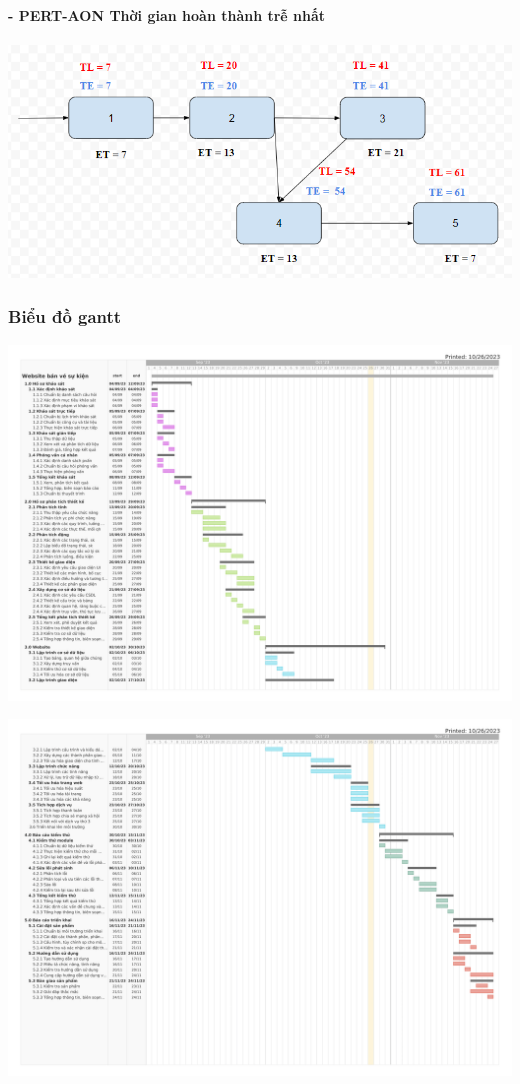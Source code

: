 \documentclass[12pt]{article}
\begin{document}
\hspace{1cm}\textbf{- PERT-AON Thời gian hoàn thành trễ nhất \\\\} 
\vspace*{0.5cm}    
\hspace{0.7cm}\includegraphics[width=14.5cm]{PERT6.png}
\vspace{0.5cm} 

\subsubsection{Biểu đồ gantt}
\newpage
\hspace{-2.5cm}\includegraphics[width=18.5cm]{Gantt_1.png}
\par
\vspace{-0.5cm}
\hspace{-2.5cm}\includegraphics[width=18.5cm]{Gantt_2.png}
\end{document}
